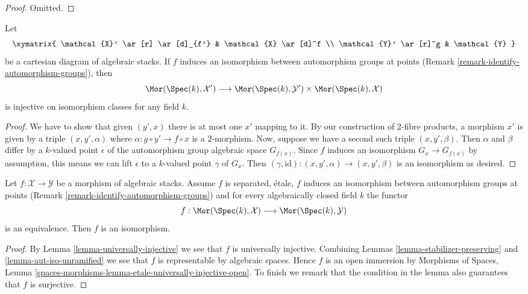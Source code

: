 \begin{proof}
Omitted.
\end{proof}

\begin{lemma}
\label{lemma-stabilizer-preserving-points-cartesian}
Let
$$
\xymatrix{
\mathcal{X}' \ar[r] \ar[d]_{f'} & \mathcal{X} \ar[d]^f \\
\mathcal{Y}' \ar[r]^g & \mathcal{Y}
}
$$
be a cartesian diagram of algebraic stacks. If $f$ induces an isomorphism
between automorphism groups at points
(Remark \ref{remark-identify-automorphism-groups}),
then
$$
\Mor(\Spec(k), \mathcal{X}')
\longrightarrow
\Mor(\Spec(k), \mathcal{Y}') \times \Mor(\Spec(k), \mathcal{X})
$$
is injective on isomorphism classes for any field $k$.
\end{lemma}

\begin{proof}
We have to show that given $(y', x)$ there is at most one $x'$
mapping to it.
By our construction of $2$-fibre products, a morphism
$x'$ is given by a triple $(x, y', \alpha)$
where  $\alpha : g \circ y' \to f \circ x$ is a $2$-morphism.
Now, suppose we have a second such triple $(x, y', \beta)$.
Then $\alpha$ and $\beta$ differ by a $k$-valued point
$\epsilon$ of the automorphism group algebraic space $G_{f(x)}$.
Since $f$ induces an isomorphism $G_x \to G_{f(x)}$ by
assumption, this means we can lift $\epsilon$ to a $k$-valued point
$\gamma$ of $G_x$. Then $(\gamma, \text{id}) : (x, y', \alpha) \to
(x, y', \beta)$ is an isomorphism as desired.
\end{proof}

\begin{lemma}
\label{lemma-etale-iso}
Let $f : \mathcal{X} \to \mathcal{Y}$ be a morphism of algebraic stacks.
Assume $f$ is separated, \'etale, $f$ induces an isomorphism
between automorphism groups at points
(Remark \ref{remark-identify-automorphism-groups})
and for every algebraically closed field $k$ the functor
$$
f : \Mor(\Spec(k), \mathcal{X}) \longrightarrow \Mor(\Spec(k), \mathcal{Y})
$$
is an equivalence. Then $f$ is an isomorphism.
\end{lemma}

\begin{proof}
By Lemma \ref{lemma-universally-injective} we see that $f$ is
universally injective. Combining
Lemmas \ref{lemma-stabilizer-preserving} and
\ref{lemma-aut-iso-unramified}
we see that $f$ is representable by algebraic spaces.
Hence $f$ is an open immersion by Morphisms of Spaces, Lemma
\ref{spaces-morphisms-lemma-etale-universally-injective-open}.
To finish we remark that the condition in the lemma also guarantees
that $f$ is surjective.
\end{proof}










